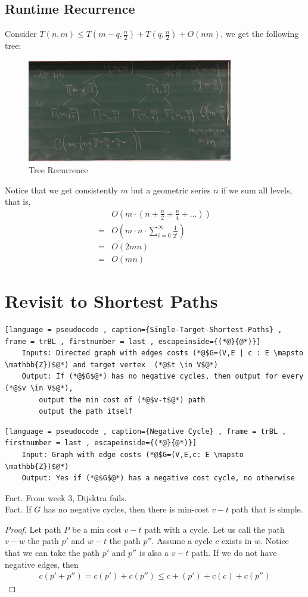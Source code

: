 \documentclass[a4paper]{article}
\theoremstyle{plain}
\theoremstyle{definition}
\theoremstyle{remark}
\begin{document}
	\subsection{Runtime Recurrence}
	Consider $T(n,m)\le T(m-q,\frac{n}{2})+T(q,\frac{n}{2})+O(nm)$, we get the following tree:
	\begin{figure}[H]
		\centering
		\includegraphics[width=0.8\textwidth]{trees.png}
		\caption{Tree Recurrence}
		\label{fig:trees-png}
	\end{figure}
	Notice that we get consistently $m$ but a geometric series $n$ if we sum all levels, that is,
	 \begin{align*}
		 &O(m\cdot(n+\frac{n}{2}+\frac{n}{4}+\ldots))\\
		=&O(m\cdot n \cdot \sum_{i=0}^{\infty} \frac{1}{2^{i}})\\
		=&O(2mn)\\
		=&O(mn)
	\end{align*}
	\section{Revisit to Shortest Paths}
	\begin{lstlisting}[language = pseudocode , caption={Single-Target-Shortest-Paths} , frame = trBL , firstnumber = last , escapeinside={(*@}{@*)}]
	Inputs: Directed graph with edges costs (*@$G=(V,E | c : E \mapsto \mathbb{Z})$@*) and target vertex  (*@$t \in V$@*)
	Output: If (*@$G$@*) has no negative cycles, then output for every (*@$v \in V$@*),
		output the min cost of (*@$v-t$@*) path
		output the path itself
	\end{lstlisting}
	\begin{lstlisting}[language = pseudocode , caption={Negative Cycle} , frame = trBL , firstnumber = last , escapeinside={(*@}{@*)}]
	Input: Graph with edge costs (*@$G=(V,E,c: E \mapsto \mathbb{Z})$@*) 
	Output: Yes if (*@$G$@*) has a negative cost cycle, no otherwise 
	\end{lstlisting}
	Fact. From week 3, Dijsktra fails.\\
	Fact. If $G$ has no negative cycles, then there is  min-cost $v-t$ path that is simple.
	\begin{proof}
		Let path $P$ be a min cost $v-t$ path with a cycle. Let us call the path $v-w$ the path $p'$ and $w-t$ the path $p''$. Assume a cycle $c$ exists in $w$. Notice that we can take the path $p'$ and $p''$ is also a $v-t$ path. If we do not have negative edges, then
		\begin{align*}
			c(p'+p'') = c(p') + c(p'') \le c+(p')+c(c)+c(p'')
		\end{align*}
	\end{proof}
\end{document}
